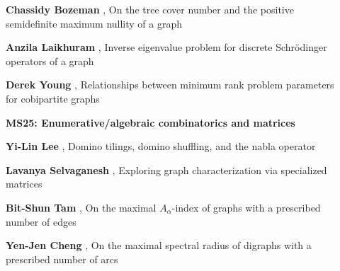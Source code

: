 \documentclass[ILAS2025-program.tex]{subfiles}
\begin{document}
\begin{description}
\begin{description}
        \item[] \textbf{Chassidy Bozeman} , On the tree cover number and the positive semidefinite maximum nullity of a graph
        \item[] \textbf{Anzila Laikhuram} , Inverse eigenvalue problem for discrete Schrödinger operators of a graph
        \item[] \textbf{Derek Young} , Relationships between minimum rank problem parameters for cobipartite graphs
        \end{description}
    \begin{description}
    \item[] {\color{mstitle}\textbf{MS25: Enumerative/algebraic combinatorics and matrices}} 
    \item[] \textbf{Yi-Lin Lee} , Domino tilings, domino shuffling, and the nabla operator
        \item[] \textbf{Lavanya Selvaganesh} , Exploring graph characterization via specialized matrices

        \item[] \textbf{Bit-Shun Tam} , On the maximal $A_\alpha$-index of graphs with a prescribed number of edges
        \item[] \textbf{Yen-Jen Cheng} , On the maximal spectral radius of digraphs with a prescribed number of arcs


\end{description}
\end{description}
\end{document}
